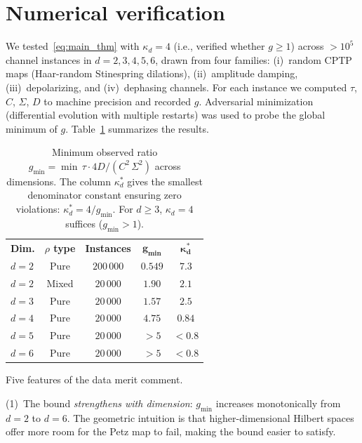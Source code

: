 \documentclass[prl,twocolumn,superscriptaddress,longbibliography,floatfix]{revtex4-2}
\newcommand{\tauasym}{\tau}
\newcommand{\kd}{\kappa_d}
\begin{document}
\section{Numerical verification}
\label{sec:numerics}

We tested~\eqref{eq:main_thm} with $\kd = 4$
(i.e., verified whether $g \geq 1$)
across $>10^5$ channel instances in
$d = 2,3,4,5,6$, drawn from four families:
(i)~random CPTP maps (Haar-random Stinespring
dilations), (ii)~amplitude damping, (iii)~depolarizing,
and (iv)~dephasing channels.
For each instance we computed $\tauasym$, $C$, $\Sigma$,
$D$ to machine precision and recorded $g$.
Adversarial minimization (differential evolution with
multiple restarts) was used to probe the global minimum
of $g$.
Table~\ref{tab:numerics} summarizes the results.

\begin{table}[htbp]
\caption{\label{tab:numerics}%
Minimum observed ratio $g_{\min}
= \min\,\tauasym \cdot 4D / (C^2\,\Sigma^2)$
across dimensions.
The column $\kd^*$ gives the smallest
denominator constant ensuring zero violations:
$\kd^* = 4/g_{\min}$.
For $d \geq 3$, $\kd = 4$ suffices ($g_{\min} > 1$).}
\begin{ruledtabular}
\begin{tabular}{lcccc}
\textbf{Dim.} & \textbf{$\rho$ type}
  & \textbf{Instances}
  & $\bm{g_{\min}}$
  & $\bm{\kd^*}$ \\
\colrule
$d = 2$ & Pure       & $200\,000$   & $0.549$ & $7.3$ \\
$d = 2$ & Mixed      & $20\,000$    & $1.90$  & $2.1$ \\
$d = 3$ & Pure       & $20\,000$    & $1.57$  & $2.5$ \\
$d = 4$ & Pure       & $20\,000$    & $4.75$  & $0.84$ \\
$d = 5$ & Pure       & $20\,000$    & $>5$    & $<0.8$ \\
$d = 6$ & Pure       & $20\,000$    & $>5$    & $<0.8$ \\
\end{tabular}
\end{ruledtabular}
\end{table}

Five features of the data merit comment.

(1)~The bound \emph{strengthens with dimension}:
$g_{\min}$ increases monotonically from $d = 2$ to
$d = 6$.
The geometric intuition is that higher-dimensional
Hilbert spaces offer more room for the Petz map to
fail, making the bound easier to satisfy.
\end{document}
